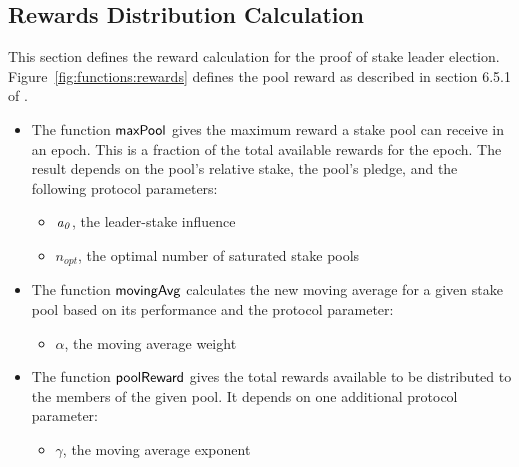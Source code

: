 \clearpage

\subsection{Rewards Distribution Calculation}
\label{sec:reward-dist}

This section defines the reward calculation for the proof of stake leader election.
Figure~\ref{fig:functions:rewards} defines the pool reward as described in section
6.5.1 of \cite{delegation_design}.

\begin{itemize}
  \item The function $\mathsf{maxPool}$ gives the maximum reward a stake pool can receive in an epoch.
    This is a fraction of the total available rewards for the epoch.
    The result depends on the pool's relative stake, the pool's pledge, and the following
    protocol parameters:
    \begin{itemize}
      \item $\mathit{a_0}$, the leader-stake influence
      \item $n_{opt}$, the optimal number of saturated stake pools
    \end{itemize}
  \item The function $\mathsf{movingAvg}$ calculates the new moving average for a given stake pool
    based on its performance and the protocol parameter:
    \begin{itemize}
      \item $\alpha$, the moving average weight
    \end{itemize}
  \item The function $\mathsf{poolReward}$ gives the total rewards available to be distributed
    to the members of the given pool. It depends on one additional protocol parameter:
    \begin{itemize}
      \item $\gamma$, the moving average exponent
    \end{itemize}
\end{itemize}

